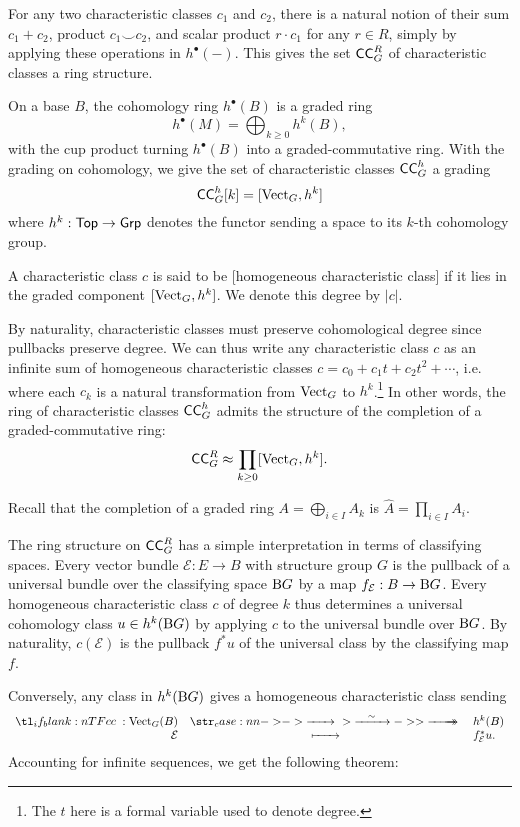 For any two characteristic classes $c_1$ and $c_2$, there is a natural notion of their sum $c_1+c_2$, product $c_1\smile c_2$, and scalar product $r\cdot c_1$ for any $r\in R$, simply by applying these operations in $h^\bullet(-)$. This gives the set $\mathsf{CC}_G^R$ of characteristic classes a ring structure.

On a base $B$, the cohomology ring $h^\bullet(B)$ is a graded ring
\[
	h^\bullet(M) = \bigoplus_{k\geq 0} h^k(B),
\]
with the cup product turning $h^\bullet(B)$ into a graded-commutative ring.
With the grading on cohomology, we give the set of characteristic classes $\mathsf{CC}_G^h$ a grading
\[
	\mathsf{CC}_G^h[k] = [\operatorname{Vect}_G, h^k]
\]
where $h^k: \mathsf{Top} \to \mathsf{Grp}$ denotes the functor sending a space to its $k$-th cohomology group.

\begin{definition}
	A characteristic class $c$ is said to be [homogeneous characteristic class] if it lies in the graded component $[\operatorname{Vect}_G, h^k]$. We denote this degree by $|c|$.
\end{definition}

By naturality, characteristic classes must preserve cohomological degree since pullbacks preserve degree. We can thus write any characteristic class $c$ as an infinite sum of homogeneous characteristic classes $c=c_0+c_1t+c_2t^2+\cdots$, i.e. where each $c_k$ is a natural transformation from $\operatorname{Vect}_G$ to $h^k$.\footnote{The $t$ here is a formal variable used to denote degree.}
In other words, the ring of characteristic classes $\mathsf{CC}_G^h$ admits the structure of the completion of a graded-commutative ring:
\[
	\mathsf{CC}_G^R \approx \prod_{k \geq 0} [\operatorname{Vect}_G, h^k].
\]
\begin{remark*}
	Recall that the completion of a graded ring $A=\bigoplus_{i\in I} A_k$ is $\widehat{A}=\prod_{i\in I} A_i$.
\end{remark*}

The ring structure on $\mathsf{CC}_G^R$ has a simple interpretation in terms of classifying spaces. Every vector bundle $\mathcal{E} : E \to B$ with structure group $G$ is the pullback of a universal bundle over the classifying space $\mathrm{B} G$ by a map $f_{\mathcal{E}} : B \to \mathrm{B} G$.
Every homogeneous characteristic class $c$ of degree $k$ thus determines a universal cohomology class $u\in h^k(\mathrm{B} G)$ by applying $c$ to the universal bundle over $\mathrm{B} G$. By naturality, $c(\mathcal{E})$ is the pullback $f^*u$ of the universal class by the classifying map $f$.

Conversely, any class in $h^k(\mathrm{B} G)$ gives a homogeneous characteristic class sending 
\[
	\lkxfunc{c}{\Vect_G(B)}{h^k(B)}{\mathcal{E}}{f_{\mathcal{E}}^*u.}
\]
Accounting for infinite sequences, we get the following theorem:

